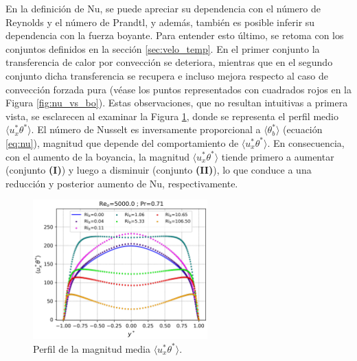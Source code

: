 En la definición de Nu, se puede apreciar su dependencia con el número de Reynolds y el número de Prandtl, y además, también es posible inferir su dependencia con la fuerza boyante. Para entender esto último, se retoma con los conjuntos definidos en la sección \ref{sec:velo_temp}. En el primer conjunto la transferencia de calor por convección se deteriora, mientras que en el segundo conjunto dicha transferencia se recupera e incluso mejora respecto al caso de convección forzada pura (véase los puntos representados con cuadrados rojos en la Figura \ref{fig:nu_vs_bo}). Estas observaciones, que no resultan intuitivas a primera vista, se esclarecen al examinar la Figura \ref{fig:uphi-Re5000-Pr071}, donde se representa el perfil medio $\langle u_x^{*}\theta^{*}\rangle$. El número de Nusselt es inversamente proporcional a $\langle\theta^{*}_b\rangle$ (ecuación \ref{eq:nu}), magnitud que depende del comportamiento de $\langle u_x^{*}\theta^{*}\rangle$. En consecuencia, con el aumento de la boyancia, la magnitud  $\langle u_x^{*}\theta^{*}\rangle$ tiende primero a aumentar (conjunto \textbf{(I)}) y luego a disminuir (conjunto \textbf{(II)}), lo que conduce a una reducción y posterior aumento de Nu, respectivamente. 
\begin{figure}[H] %
  \centering
  \includegraphics[width=0.6\textwidth]{figures/cap5/Re5000-Pr071/uxphi_profile.png}  
  \caption{Perfil de la magnitud media $\langle u^{*}_x\theta^{*}\rangle$.}
  \label{fig:uphi-Re5000-Pr071}
\end{figure}


